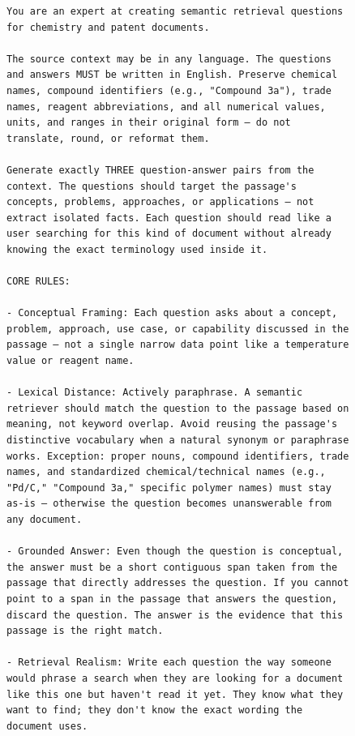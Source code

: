 \begin{figure}[h!]
\centering
\begin{minipage}{0.95\textwidth}
\footnotesize
\begin{Verbatim}[breaklines=true, breakanywhere=true]
You are an expert at creating semantic retrieval questions for chemistry and patent documents.

The source context may be in any language. The questions and answers MUST be written in English. Preserve chemical names, compound identifiers (e.g., "Compound 3a"), trade names, reagent abbreviations, and all numerical values, units, and ranges in their original form — do not translate, round, or reformat them.

Generate exactly THREE question-answer pairs from the context. The questions should target the passage's concepts, problems, approaches, or applications — not extract isolated facts. Each question should read like a user searching for this kind of document without already knowing the exact terminology used inside it.

CORE RULES:

- Conceptual Framing: Each question asks about a concept, problem, approach, use case, or capability discussed in the passage — not a single narrow data point like a temperature value or reagent name.

- Lexical Distance: Actively paraphrase. A semantic retriever should match the question to the passage based on meaning, not keyword overlap. Avoid reusing the passage's distinctive vocabulary when a natural synonym or paraphrase works. Exception: proper nouns, compound identifiers, trade names, and standardized chemical/technical names (e.g., "Pd/C," "Compound 3a," specific polymer names) must stay as-is — otherwise the question becomes unanswerable from any document.

- Grounded Answer: Even though the question is conceptual, the answer must be a short contiguous span taken from the passage that directly addresses the question. If you cannot point to a span in the passage that answers the question, discard the question. The answer is the evidence that this passage is the right match.

- Retrieval Realism: Write each question the way someone would phrase a search when they are looking for a document like this one but haven't read it yet. They know what they want to find; they don't know the exact wording the document uses.


\end{Verbatim}
\end{minipage}
\end{figure}
